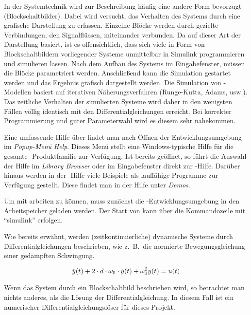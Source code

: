 In der Systemtechnik wird zur Beschreibung häufig eine andere Form bevorzugt (Blockschaltbilder).
Dabei wird versucht, das Verhalten des Systems durch eine grafische Darstellung zu erfassen.
Einzelne Blöcke werden durch gezielte Verbindungen, den Signalflüssen, miteinander verbunden.
Da  auf dieser Art der Darstellung basiert, ist es offensichtlich, dass sich viele in Form von Blockschaltbildern vorliegender Systeme unmittelbar in Simulink programmieren und simulieren lassen.
Nach dem Aufbau des Systems im Eingabefenster, müssen die Blöcke parametriert werden.
Anschließend kann die Simulation gestartet werden und das Ergebnis grafisch dargestellt werden.
Die Simulation von -Modellen basiert auf iterativen Näherungsverfahren (Runge-Kutta, Adams, usw.).
Das zeitliche Verhalten der simulierten Systeme wird daher in den wenigsten Fällen völlig identisch mit den Differentialgleichungen erreicht.
Bei korrekter Programmierung und guter Parameterwahl wird es diesem sehr nahekommen.

Eine umfassende Hilfe über  findet man nach Öffnen der  Entwicklungsumgebung im \emph{Popup-Menü} \emph{Help}.
Dieses Menü stellt eine Windows-typische Hilfe für die gesamte -Produktfamilie zur Verfügung.
Ist  bereits geöffnet, so führt die Auswahl der Hilfe im \emph{Library Browser} oder im Eingabefenster direkt zur -Hilfe.
Darüber hinaus werden in der -Hilfe viele Beispiele als lauffähige Programme zur Verfügung gestellt.
Diese findet man in der Hilfe unter \emph{Demos}.

Um mit  arbeiten zu können, muss zunächst die -Entwicklungsumgebung in den Arbeitspeicher geladen werden.
Der Start von  kann über die Kommandozeile mit \enquote{simulink} erfolgen.

Wie bereits erwähnt, werden (zeitkontinuierliche) dynamische Systeme durch Differentialgleichungen beschrieben, wie z.\ B.\ die normierte Bewegungsgleichung einer gedämpften Schwingung.

\begin{align*}
	\ddot{y}(t) + 2\cdot d\cdot \omega_{\mathrm{0}}\cdot \dot{y}(t) + \omega_{\mathrm{0}}^{2} y(t) = u(t)
\end{align*}

Wenn das System durch ein Blockschaltbild beschrieben wird, so betrachtet man nichts anderes, als die Lösung der Differentialgleichung.
In diesem Fall ist  ein numerischer Differentialgleichungslöser für dieses Projekt.

